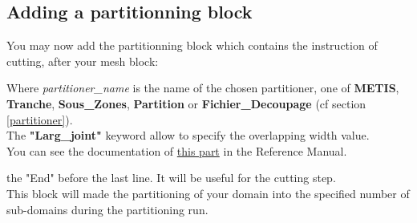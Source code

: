 \subsection{Adding a partitionning block}
You may now add the partitionning block which contains the instruction of cutting, after your mesh block:
\begin{center}
\end{center}
Where \textit{partitioner\_name} is the name of the chosen partitioner, one of \textbf{METIS}, \textbf{Tranche}, \textbf{Sous\_Zones}, \textbf{Partition} or \textbf{Fichier\_Decoupage} (cf section \ref{partitioner}).\\
The \textbf{"Larg\_joint"} keyword allow to specify the overlapping width value.\\
You can see the documentation of \href{TRUST_Reference_Manual.pdf\#partition}{this part} in the \trust Reference Manual.

\Note the "End" before the last line. It will be useful for the cutting step.\\

This block will made the partitioning of your domain into the specified number of sub-domains during the partitioning run.


